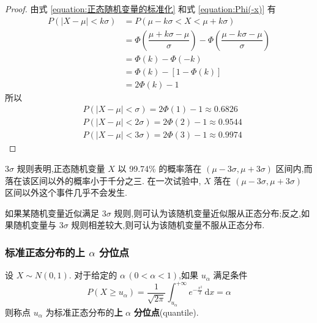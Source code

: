 \begin{proof}
    由式 \eqref{equation:正态随机变量的标准化} 和式 \eqref{equation:Phi(-x)} 有
    $$
    \begin{aligned}
        P(|X-\mu| < k \sigma) &= P(\mu - k \sigma < X < \mu + k \sigma) \\
        &= \varPhi(\dfrac{\mu + k \sigma - \mu}{\sigma}) - \varPhi(\dfrac{\mu - k \sigma - \mu}{\sigma}) \\
        &= \varPhi(k) - \varPhi(-k) \\
        &= \varPhi(k) - [1 - \varPhi(k)] \\
        &= 2\varPhi(k) - 1
    \end{aligned}
    $$
    所以
    $$
    \begin{aligned}
        & P(|X - \mu| < \sigma) = 2\varPhi(1) - 1 \approx 0.6826 \\
        & P(|X - \mu| < 2\sigma) = 2\varPhi(2) - 1 \approx 0.9544 \\
        & P(|X - \mu| < 3\sigma) = 2\varPhi(3) - 1 \approx 0.9974
    \end{aligned}
    $$
\end{proof}

\begin{note}
    \indent $3\sigma$ 规则表明,正态随机变量 $X$ 以 99.74\% 的概率落在 $(\mu - 3\sigma, \mu + 3\sigma)$ 区间内,而落在该区间以外的概率小于千分之三. 在一次试验中, $X$ 落在 $(\mu - 3\sigma, \mu + 3\sigma)$ 区间以外这个事件几乎不会发生.

    如果某随机变量近似满足 $3\sigma$ 规则,则可认为该随机变量近似服从正态分布;反之,如果随机变量与 $3\sigma$ 规则相差较大,则可认为该随机变量不服从正态分布.
\end{note}

\subsubsection{标准正态分布的上 \texorpdfstring{$\alpha$}{} 分位点}

\begin{definition}
    \indent 设 $X \sim N(0,1)$. 对于给定的 $\alpha \, (0 < \alpha < 1)$,如果 $u_{\alpha}$ 满足条件
    $$
    P(X \geqslant u_{\alpha}) = \dfrac{1}{\sqrt{2\pi}} \int_{u_{\alpha}}^{+\infty} e^{-\frac{x^2}{2}} \, \text{d}x = \alpha
    $$
    则称点 $u_{\alpha}$ 为标准正态分布的\textbf{上} $\alpha$ \textbf{分位点}(quantile).
\end{definition}

